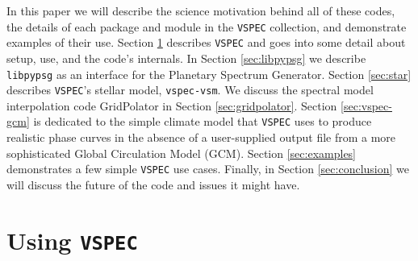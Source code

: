 \documentclass[linenumbers,5p,twocolumn,authoryear]{elsarticle}
\newcommand{\vspec}[1]{\texttt{VSPEC}#1}
\begin{document}
In this paper we will describe the science motivation behind all of these codes, the details of each package and module in the \vspec{} collection, and demonstrate examples of their use. Section \ref{sec:vspec} describes \vspec{} and goes into some detail about setup, use, and the code's internals. In Section \ref{sec:libpypsg} we describe \texttt{libpypsg} as an interface for the Planetary Spectrum Generator. Section \ref{sec:star} describes \vspec{}'s stellar model, \texttt{vspec-vsm}. We discuss the spectral model interpolation code GridPolator in Section \ref{sec:gridpolator}. Section \ref{sec:vspec-gcm} is dedicated to the simple climate model that \vspec{} uses to produce realistic phase curves in the absence of a user-supplied output file from a more sophisticated Global Circulation Model (GCM). Section \ref{sec:examples} demonstrates a few simple \vspec{} use cases. Finally, in Section \ref{sec:conclusion} we will discuss the future of the code and issues it might have.

\section{Using \vspec{}}
\label{sec:vspec}
\end{document}
